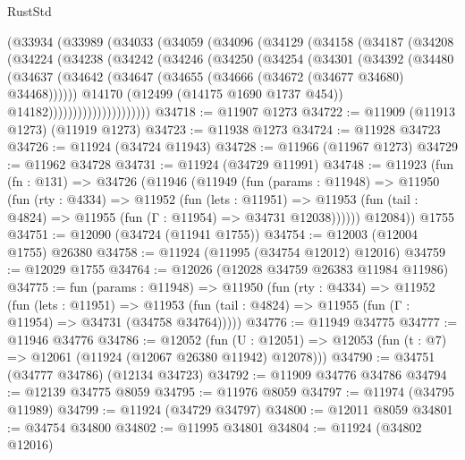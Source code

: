 \begin{lexlean}{RustStd}
\begin{coremodule}
          (@33934
            (@33989
              (@34033
                (@34059
                  (@34096
                    (@34129
                      (@34158
                        (@34187
                          (@34208
                            (@34224
                              (@34238
                                (@34242
                                  (@34246
                                    (@34250
                                      (@34254
                                        (@34301
                                          (@34392
                                            (@34480
                                              (@34637
                                                (@34642
                                                  (@34647
                                                    (@34655
                                                      (@34666 (@34672 (@34677 @34680) @34468))))))
                                              @14170
                                              (@12499 (@14175 @1690 @1737 @454))
                                              @14182)))))))))))))))))))))
@34718 := @11907 @1273
@34722 := @11909 (@11913 @1273) (@11919 @1273)
@34723 := @11938 @1273
@34724 := @11928 @34723
@34726 := @11924 (@34724 @11943)
@34728 := @11966 (@11967 @1273)
@34729 := @11962 @34728
@34731 := @11924 (@34729 @11991)
@34748 := @11923
    (fun (fn : @131) =>
    @34726
      (@11946
        (@11949
          (fun (params : @11948) =>
          @11950
            (fun (rty : @4334) =>
            @11952
              (fun (lets : @11951) =>
              @11953 (fun (tail : @4824) => @11955 (fun (Γ : @11954) => @34731 @12038))))))
        @12084))
    @1755
@34751 := @12090 (@34724 (@11941 @1755))
@34754 := @12003 (@12004 @1755) @26380
@34758 := @11924 (@11995 (@34754 @12012) @12016)
@34759 := @12029 @1755
@34764 := @12026 (@12028 @34759 @26383 @11984 @11986)
@34775 := fun (params : @11948) =>
  @11950
    (fun (rty : @4334) =>
    @11952
      (fun (lets : @11951) =>
      @11953 (fun (tail : @4824) => @11955 (fun (Γ : @11954) => @34731 (@34758 @34764)))))
@34776 := @11949 @34775
@34777 := @11946 @34776
@34786 := @12052
    (fun (U : @12051) => @12053 (fun (t : @7) => @12061 (@11924 (@12067 @26380 @11942) @12078)))
@34790 := @34751 (@34777 @34786) (@12134 @34723)
@34792 := @11909 @34776 @34786
@34794 := @12139 @34775 @8059
@34795 := @11976 @8059
@34797 := @11974 (@34795 @11989)
@34799 := @11924 (@34729 @34797)
@34800 := @12011 @8059
@34801 := @34754 @34800
@34802 := @11995 @34801
@34804 := @11924 (@34802 @12016)

\end{coremodule}
\end{lexlean}

